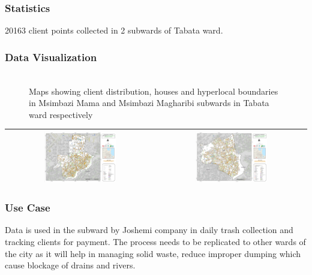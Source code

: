 \documentclass[a4paper,12pt,twoside]{article}
\begin{document}
\subsubsection{Statistics}
20163 client points collected in 2 subwards of Tabata ward.

\subsubsection{Data Visualization}

\begin{figure}[h]
	\caption{Maps showing client distribution, houses and hyperlocal boundaries in Msimbazi Mama and Msimbazi Magharibi subwards in Tabata ward respectively}
	\centering
	\includegraphics[width=0\textwidth]{images/Building_Footprint_Digitization.png}
\end{figure}
\begin{tabular}{|c@{}c|}
	\hline
	
	\includegraphics[width=0.5\textwidth]{images/Msimbazi_mama.png}&%
	\includegraphics[width=0.5\textwidth]{images/Msimbazi_magharibi.png}\\
	\hline
\end{tabular}

\subsubsection{Use Case}
Data is used in the subward by Joshemi company in daily trash collection and tracking clients for payment. The process needs to be replicated to other wards of the city as it will help in managing solid waste, reduce improper dumping which cause blockage of drains and rivers. 
\end{document}

